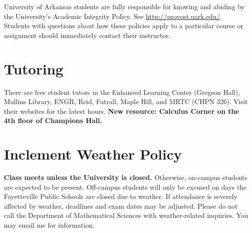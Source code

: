 \documentclass[margin,line,pifont,palatino,courier]{res}
\begin{document}
\begin{resume}
\vspace{-0.1in}
University of Arkansas students are fully responsible for knowing and abiding by the University's Academic Integrity Policy.  See \url{http://provost.uark.edu/}. Students with questions about how these policies apply to a particular course or assignment should immediately contact their instructor.

%

\section{\sc Tutoring} There are free student tutors in the Enhanced Learning Center (Gregson Hall), Mullins Library, ENGR, Reid, Futrall, Maple Hill, and MRTC (CHPN 326). Visit their websites for the latest hours.  \textbf{New resource: Calculus Corner on the 4th floor of Champions Hall.}

\section{\sc Inclement Weather Policy} {\bf Class meets unless the University is closed.}  Otherwise, on-campus students are expected to be present.  Off-campus students will only be excused on days the Fayetteville Public Schools are closed due to weather.  If attendance is severely affected by weather, deadlines and exam dates may be adjusted.  Please do not call the Department of Mathematical Sciences with weather-related inquiries.  You may email me for information.


\end{resume}
\end{document}
